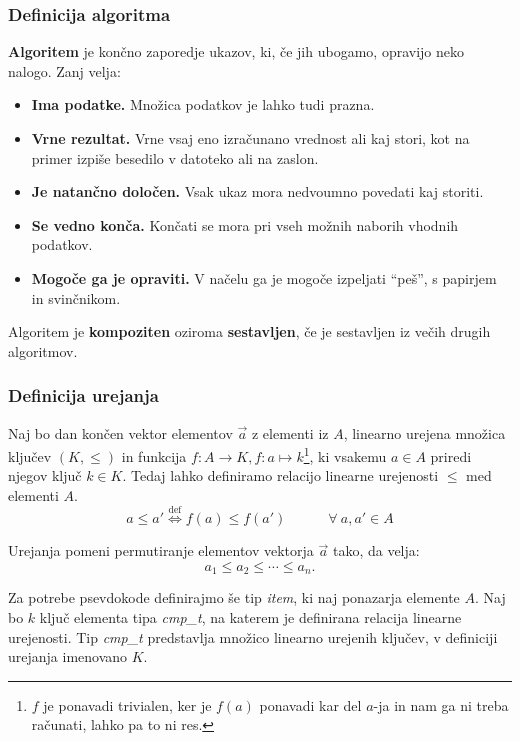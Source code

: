 \documentclass[a4paper,oneside,12pt]{article}
\begin{document}
\subsubsection{Definicija algoritma}

\begin{definicija}
\textbf{Algoritem} je končno zaporedje ukazov, ki, če jih ubogamo, opravijo neko nalogo.
Zanj velja:
\begin{itemize}
  \item \textbf{Ima podatke.} Množica podatkov je lahko tudi prazna.
  \item \textbf{Vrne rezultat.} Vrne vsaj eno izračunano vrednost ali kaj stori, kot na primer
    izpiše besedilo v datoteko ali na zaslon.
  \item \textbf{Je natančno določen.} Vsak ukaz mora nedvoumno povedati kaj storiti.
  \item \textbf{Se vedno konča.} Končati se mora pri vseh možnih naborih vhodnih podatkov.
  \item \textbf{Mogoče ga je opraviti.} V načelu ga je mogoče izpeljati ``peš'', s papirjem in
    svinčnikom.
\end{itemize}
\end{definicija}

\begin{definicija}
  Algoritem je \textbf{kompoziten} oziroma \textbf{sestavljen}, če je sestavljen iz večih
  drugih algoritmov.
\end{definicija}

\subsubsection{Definicija urejanja}
\label{chapter:sortdef}
Naj bo dan končen vektor elementov $\vec{a}$ z elementi iz $A$, linearno urejena množica ključev $(K,
\leq)$ in funkcija $f\!\!: A \rightarrow K, f\!\!: a \mapsto k$\footnote{
$f$ je ponavadi trivialen, ker je $f(a)$ ponavadi kar del
$a$-ja in nam ga ni treba računati, lahko pa to ni res.}, ki vsakemu $a \in A$ priredi
njegov ključ $k \in K$.
Tedaj lahko definiramo relacijo linearne urejenosti $\leq$ med elementi $A$.
\[ a \leq a' \overset{\text{def}}{\Longleftrightarrow} f(a) \leq f(a') \hspace{3em} \forall\ a, a' \in A \]


Urejanja pomeni permutiranje elementov vektorja $\vec{a}$ tako, da velja:
\[ a_1 \leq a_2 \leq \cdots \leq a_n.\]

Za potrebe psevdokode definirajmo še tip \emph{item}, ki naj ponazarja elemente $A$.
Naj bo $k$ ključ elementa tipa \emph{cmp\_t}, na katerem je definirana relacija
linearne urejenosti. Tip \emph{cmp\_t} predstavlja množico linearno urejenih ključev,
v definiciji urejanja imenovano $K$.
\end{document}
